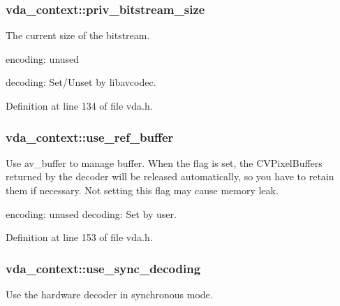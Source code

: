 \subsubsection[{\texorpdfstring{priv\+\_\+bitstream\+\_\+size}{priv_bitstream_size}}]{ vda\+\_\+context\+::priv\+\_\+bitstream\+\_\+size}\hypertarget{structvda__context_a625ea817b807502f9fbf764c882b1bf7}{}\label{structvda__context_a625ea817b807502f9fbf764c882b1bf7}
The current size of the bitstream.


\begin{DoxyItemize}
\item encoding\+: unused
\item decoding\+: Set/\+Unset by libavcodec. 
\end{DoxyItemize}

Definition at line 134 of file vda.\+h.

\subsubsection[{\texorpdfstring{use\+\_\+ref\+\_\+buffer}{use_ref_buffer}}]{ vda\+\_\+context\+::use\+\_\+ref\+\_\+buffer}\hypertarget{structvda__context_a59cd6ad473ff9041df27a7fd92dd6b5d}{}\label{structvda__context_a59cd6ad473ff9041df27a7fd92dd6b5d}
Use av\+\_\+buffer to manage buffer. When the flag is set, the C\+V\+Pixel\+Buffers returned by the decoder will be released automatically, so you have to retain them if necessary. Not setting this flag may cause memory leak.

encoding\+: unused decoding\+: Set by user. 

Definition at line 153 of file vda.\+h.

\subsubsection[{\texorpdfstring{use\+\_\+sync\+\_\+decoding}{use_sync_decoding}}]{ vda\+\_\+context\+::use\+\_\+sync\+\_\+decoding}\hypertarget{structvda__context_a76a944387b0dfe2b1b690ff4ad9f646a}{}\label{structvda__context_a76a944387b0dfe2b1b690ff4ad9f646a}
Use the hardware decoder in synchronous mode.

